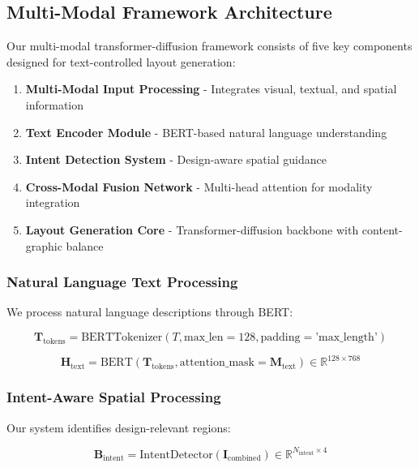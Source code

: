 \documentclass[journal,article,submit,pdftex,moreauthors]{Definitions/mdpi}
\begin{document}
\subsection{Multi-Modal Framework Architecture}

Our multi-modal transformer-diffusion framework consists of five key components designed for text-controlled layout generation:

\begin{enumerate}
\item \textbf{Multi-Modal Input Processing} - Integrates visual, textual, and spatial information
\item \textbf{Text Encoder Module} - BERT-based natural language understanding
\item \textbf{Intent Detection System} - Design-aware spatial guidance  
\item \textbf{Cross-Modal Fusion Network} - Multi-head attention for modality integration
\item \textbf{Layout Generation Core} - Transformer-diffusion backbone with content-graphic balance
\end{enumerate}

\subsubsection{Natural Language Text Processing}

We process natural language descriptions through BERT:
\begin{linenomath}
\begin{equation}
\mathbf{T}_{\text{tokens}} = \text{BERTTokenizer}(T, \text{max\_len}=128, \text{padding}=\text{'max\_length'})
\end{equation}
\end{linenomath}

\begin{linenomath}
\begin{equation}
\mathbf{H}_{\text{text}} = \text{BERT}(\mathbf{T}_{\text{tokens}}, \text{attention\_mask}=\mathbf{M}_{\text{text}}) \in \mathbb{R}^{128 \times 768}
\end{equation}
\end{linenomath}

\subsubsection{Intent-Aware Spatial Processing}

Our system identifies design-relevant regions:
\begin{linenomath}
\begin{equation}
\mathbf{B}_{\text{intent}} = \text{IntentDetector}(\mathbf{I}_{\text{combined}}) \in \mathbb{R}^{N_{\text{intent}} \times 4}
\end{equation}
\end{linenomath}
\end{document}
